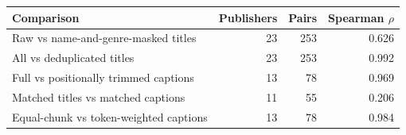 \begin{tabular}{@{}lrrr@{}}
\toprule
Comparison & Publishers & Pairs & Spearman $\rho$ \\
\midrule
Raw vs name-and-genre-masked titles & 23 & 253 & 0.626 \\
All vs deduplicated titles & 23 & 253 & 0.992 \\
Full vs positionally trimmed captions & 13 & 78 & 0.969 \\
Matched titles vs matched captions & 11 & 55 & 0.206 \\
Equal-chunk vs token-weighted captions & 13 & 78 & 0.984 \\
\bottomrule
\end{tabular}
